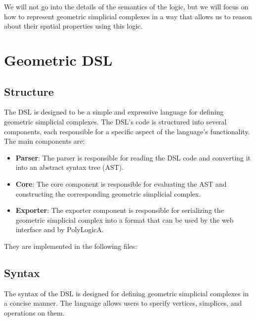 \documentclass[11pt,a4paper]{article}
\begin{document}
We will not go into the details of the semantics of the logic, but we will focus on how to represent geometric simplicial complexes in a way that allows us to reason about their spatial properties using this logic.


\section{Geometric DSL}

\subsection{Structure}
The DSL is designed to be a simple and expressive language for defining geometric simplicial complexes. The DSL's code is structured into several components, each responsible for a specific aspect of the language's functionality. The main components are:
\begin{itemize}
    \item \textbf{Parser}: The parser is responsible for reading the DSL code and converting it into an abstract syntax tree (AST).
    \item \textbf{Core}: The core component is responsible for evaluating the AST and constructing the corresponding geometric simplicial complex.
    \item \textbf{Exporter}: The exporter component is responsible for serializing the geometric simplicial complex into a format that can be used by the web interface and by PolyLogicA.
\end{itemize}

They are implemented in the following files:


\subsection{Syntax}
The syntax of the DSL is designed for defining geometric simplicial complexes in a concise manner. The language allows users to specify vertices, simplices, and operations on them.

\newpage
\end{document}
